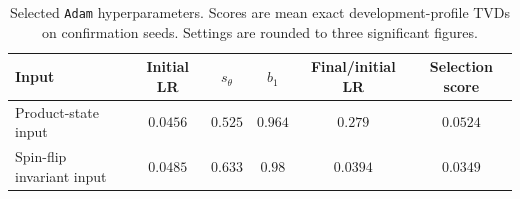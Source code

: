 \begin{table}[!htbp]
\centering
\small
\renewcommand{\arraystretch}{1.12}
\setlength{\tabcolsep}{3pt}
\caption{Selected \texttt{Adam} hyperparameters. Scores are mean exact development-profile TVDs on confirmation seeds. Settings are rounded to three significant figures.}
\label{tab:cw_symmetry_settings}
\begin{tabular}{lccccc}
\toprule
Input & Initial LR & $s_\theta$ & $b_1$ & Final/initial LR & Selection score \\
\midrule
Product-state input & $0.0456$ & $0.525$ & $0.964$ & $0.279$ & $0.0524$ \\
Spin-flip invariant input & $0.0485$ & $0.633$ & $0.98$ & $0.0394$ & $0.0349$ \\
\bottomrule
\end{tabular}
\end{table}
